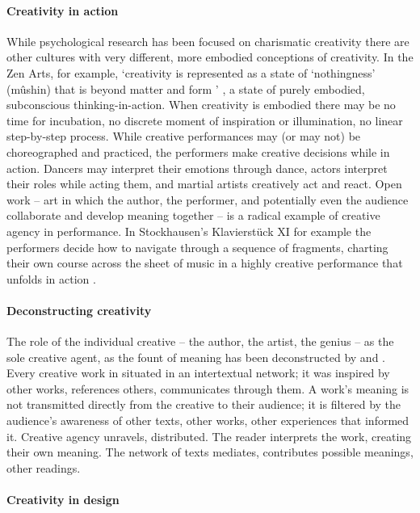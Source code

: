 \documentclass{article}
\begin{document}
\paragraph{Creativity in action}
While psychological research has been focused on charismatic creativity
there are other cultures with very different, more embodied conceptions of creativity.
In the Zen Arts, for example, 
`creativity is represented as a state of `nothingness' (m{\^u}shin) that is beyond matter and form ' \citep{Cox2011}, a state of purely embodied, subconscious thinking-in-action.
%
When creativity is embodied there may be no time for incubation, no discrete moment of inspiration or illumination, no linear step-by-step process. 
%
While creative performances may (or may not) be choreographed and practiced, the performers make creative decisions while in action. Dancers may interpret their emotions through dance, actors interpret their roles while acting them, and martial artists creatively act and react. 
%
Open work -- art in which the author, the performer, and potentially even the audience collaborate and develop meaning together -- is a radical example of creative agency in performance.
In Stockhausen's Klavierst{\"u}ck XI for example the performers decide 
how to navigate through a sequence of fragments, 
charting their own course across the sheet of music in a highly creative performance that unfolds in action \citep{Eco1989}. 
%

\paragraph{Deconstructing creativity}
The role of the individual creative -- the author, the artist, the genius -- as the sole creative agent, as the fount of meaning
has been deconstructed by \citeauthor{Barthes1977} \citeyearpar{Barthes1977}  and \citeauthor{Foucault1998} \citeyearpar{Foucault1998}. 
%
Every creative work in situated in an intertextual network; 
it was inspired by other works, references others, communicates through them.
A work's meaning is not transmitted directly from the creative to their audience; it is filtered by the audience's awareness of other texts, other works, other experiences that informed it. Creative agency unravels, distributed. 
The reader interprets the work, creating their own meaning.  
The network of texts mediates, contributes possible meanings, other readings.

\paragraph{Creativity in design}
\end{document}
